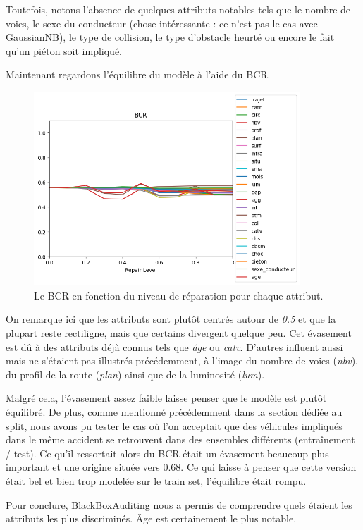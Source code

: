 \documentclass{article}
\begin{document}
    Toutefois, notons l'absence de quelques attributs notables tels que le nombre de voies, le sexe du conducteur (chose intéressante :
    ce n'est pas le cas avec GaussianNB), le type de collision, le type d'obstacle heurté ou encore le fait qu'un piéton soit impliqué.
    
    Maintenant regardons l'équilibre du modèle à l'aide du BCR.

    \begin{figure}[h]
        \centering
        \includegraphics[width=10cm]{./img/BCR.png}
        \caption{Le BCR en fonction du niveau de réparation pour chaque attribut.}
    \end{figure}

    On remarque ici que les attributs sont plutôt centrés autour de \textit{0.5} et que la plupart reste rectiligne, mais que certains divergent
    quelque peu. Cet évasement est dû à des attributs déjà connus tels que \textit{âge} ou \textit{catv}. D'autres influent aussi mais ne s'étaient pas 
    illustrés précédemment, à l'image du nombre de voies (\textit{nbv}), du profil de la route (\textit{plan}) ainsi que de la luminosité (\textit{lum}). 

    Malgré cela, l'évasement assez faible laisse penser que le modèle est plutôt équilibré. De plus, comme mentionné précédemment 
    dans la section dédiée au split, nous avons pu tester le cas où l'on acceptait que des véhicules impliqués dans le même accident
    se retrouvent dans des ensembles différents (entraînement / test). Ce qu'il ressortait alors du BCR était un évasement beaucoup
    plus important et une origine située vers 0.68. Ce qui laisse à penser que cette version était bel et bien trop modelée sur le train
    set, l'équilibre était rompu.

    Pour conclure, BlackBoxAuditing nous a permis de comprendre quels étaient les attributs les plus discriminés. Âge est certainement le plus notable.
\end{document}
